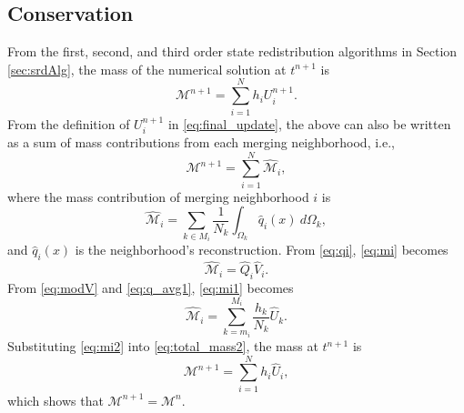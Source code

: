 \subsection{Conservation}\label{sec:cons}
From the first, second, and third order state redistribution algorithms in Section \ref{sec:srdAlg}, the mass of the numerical solution at $t^{n+1}$ is
\begin{equation}\label{eq:total_mass}
\mathcal{M}^{n+1} = \sum^N_{i=1} h_i U^{n+1}_i.
\end{equation}
From the definition of $U^{n+1}_i$ in \eqref{eq:final_update}, the above can also be written as a sum of mass contributions from each merging neighborhood, i.e.,
\begin{equation}\label{eq:total_mass2}
\mathcal{M}^{n+1} = \sum^N_{i=1} \hat{\mathcal{M}}_i,
\end{equation}
where the mass contribution of merging neighborhood $i$ is
\begin{equation}\label{eq:mi}
\hat{\mathcal{M}}_i = \sum_{k \in M_i}\frac{1}{N_k} \int_{\Omega_k}\hat q_i(x) ~d\Omega_k,
\end{equation}
and $\hat q_i(x)$ is the neighborhood's reconstruction.  From \eqref{eq:qi}, \eqref{eq:mi} becomes
\begin{equation}\label{eq:mi1}
\hat{\mathcal{M}}_i = \hat Q_i \hat V_i.
\end{equation}
From \eqref{eq:modV} and \eqref{eq:q_avg1}, \eqref{eq:mi1} becomes
\begin{equation}\label{eq:mi2}
\hat{\mathcal{M}}_i = \sum^{M_i}_{k = m_i}\frac{h_k}{N_k} \hat U_{k}.
\end{equation}
Substituting \eqref{eq:mi2} into \eqref{eq:total_mass2}, the mass at $t^{n+1}$ is
$$
\mathcal{M}^{n+1} = \sum^{N}_{i=1} h_i \hat U_i,
$$
which shows that $\mathcal{M}^{n+1}  = \mathcal{M}^{n} $.
